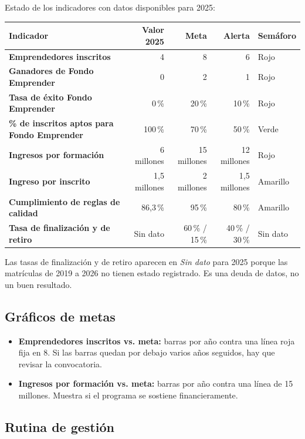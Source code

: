 \documentclass[11pt,a4paper]{article}
\begin{document}
Estado de los indicadores con datos disponibles para 2025:

\begin{center}
\begin{tabularx}{\linewidth}{@{}>{\bfseries}p{4.8cm}rrrX@{}}
\toprule
Indicador & Valor 2025 & Meta & Alerta & Semáforo\\
\midrule
Emprendedores inscritos & 4 & 8 & 6 & Rojo\\
Ganadores de Fondo Emprender & 0 & 2 & 1 & Rojo\\
Tasa de éxito Fondo Emprender & 0\,\% & 20\,\% & 10\,\% & Rojo\\
\% de inscritos aptos para Fondo Emprender & 100\,\% & 70\,\% & 50\,\% & Verde\\
Ingresos por formación & 6 millones & 15 millones & 12 millones & Rojo\\
Ingreso por inscrito & 1,5 millones & 2 millones & 1,5 millones & Amarillo\\
Cumplimiento de reglas de calidad & 86,3\,\% & 95\,\% & 80\,\% & Amarillo\\
Tasa de finalización y de retiro & Sin dato & 60\,\% / 15\,\% & 40\,\% / 30\,\% & Sin dato\\
\bottomrule
\end{tabularx}
\end{center}

Las tasas de finalización y de retiro aparecen en \emph{Sin dato} para 2025 porque las matrículas de 2019 a 2026 no tienen estado registrado. Es una deuda de datos, no un buen resultado.

\subsection{Gráficos de metas}

\begin{itemize}[leftmargin=1.4em]
  \item \textbf{Emprendedores inscritos vs. meta:} barras por año contra una línea roja fija en 8. Si las barras quedan por debajo varios años seguidos, hay que revisar la convocatoria.
  \item \textbf{Ingresos por formación vs. meta:} barras por año contra una línea de 15 millones. Muestra si el programa se sostiene financieramente.
\end{itemize}

\subsection{Rutina de gestión}
\end{document}
